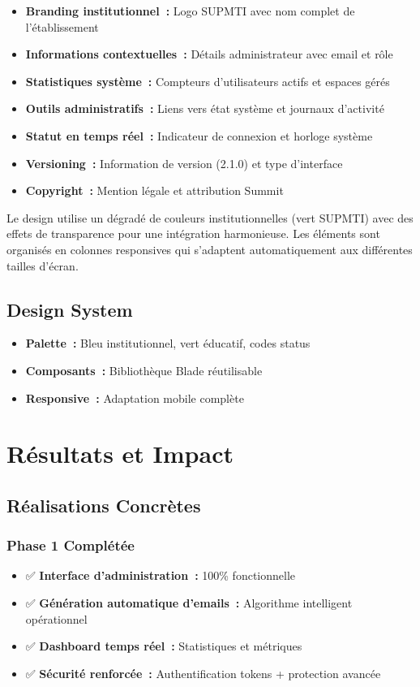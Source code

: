 \documentclass[12pt, a4paper, twoside, openany]{report}
\begin{document}
\begin{itemize}
    \item \textbf{Branding institutionnel~:} Logo SUPMTI avec nom complet de l'établissement
    \item \textbf{Informations contextuelles~:} Détails administrateur avec email et rôle
    \item \textbf{Statistiques système~:} Compteurs d'utilisateurs actifs et espaces gérés
    \item \textbf{Outils administratifs~:} Liens vers état système et journaux d'activité
    \item \textbf{Statut en temps réel~:} Indicateur de connexion et horloge système
    \item \textbf{Versioning~:} Information de version (2.1.0) et type d'interface
    \item \textbf{Copyright~:} Mention légale et attribution Summit
\end{itemize}

Le design utilise un dégradé de couleurs institutionnelles (vert SUPMTI) avec des effets de transparence pour une intégration harmonieuse. Les éléments sont organisés en colonnes responsives qui s'adaptent automatiquement aux différentes tailles d'écran.

\section{Design System}
\begin{itemize}
    \item \textbf{Palette~:} Bleu institutionnel, vert éducatif, codes status
    \item \textbf{Composants~:} Bibliothèque Blade réutilisable  
    \item \textbf{Responsive~:} Adaptation mobile complète
\end{itemize}

\chapter{Résultats et Impact}

\section{Réalisations Concrètes}

\subsection{Phase 1 Complétée}
\begin{itemize}
    \item ✅ \textbf{Interface d'administration~:} 100\% fonctionnelle
    \item ✅ \textbf{Génération automatique d'emails~:} Algorithme intelligent opérationnel
    \item ✅ \textbf{Dashboard temps réel~:} Statistiques et métriques
    \item ✅ \textbf{Sécurité renforcée~:} Authentification tokens + protection avancée
\end{itemize}
\end{document}
